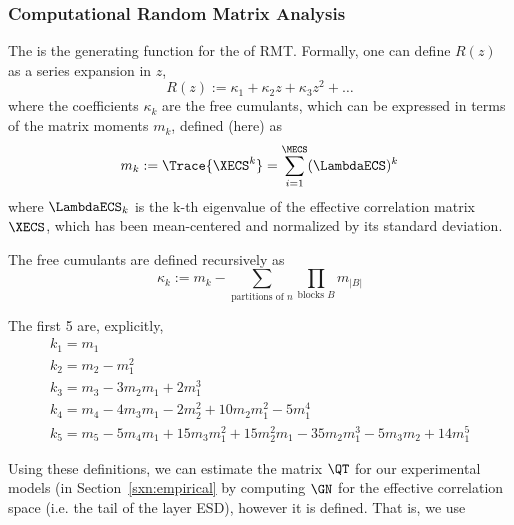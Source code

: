 \subsubsection{Computational Random Matrix Analysis}
\label{sxn:comp_rmt}
The \RTransform is the generating function for the \emph{\FreeCumulants} of RMT.  Formally, one can define $R(z)$ as a series expansion in $z$,
\begin{equation}
  \label{eqn:Rz_expansion}
  R(z) := \kappa_1 + \kappa_2 z + \kappa_3 z^2 + \ldots 
\end{equation}
where the coefficients $\kappa_{k}$ are the free cumulants, which can be expressed
in terms of the matrix moments $m_{k}$\cite{FreeCumulants}, defined (here) as
\begin{equation}
  \label{eqn:mk_defn}
  m_{k}:=\Trace{\XECS^{k}}=\sum_{i=1}^{\MECS}(\LambdaECS)^{k}
\end{equation}
where $\LambdaECS_{k}$ is the k-th eigenvalue of the effective correlation matrix $\mathbf\XECS$,
which  has been mean-centered and normalized by its standard deviation.

The free cumulants are defined recursively as
\begin{equation}
  \label{eqn:kappa_defn}
  \kappa_k := m_k - \sum_{\text{partitions of } n} \prod_{\text{blocks } B} m_{|B|} 
\end{equation}

The first 5 \emph{\Cumulants} are, explicitly,
\begin{align}
  \label{eqn:kappa_defn_2}
  k_1 = m_1 \\ \nonumber
  k_2 = m_2 - m_1^2 \\ \nonumber
  k_3 = m_3 - 3 m_2 m_1 + 2 m_1^3 \\ \nonumber
  k_4 = m_4 - 4 m_3 m_1 - 2 m_2^2 + 10 m_2 m_1^2 - 5 m_1^4 \\ \nonumber 
  k_5 = m_5 - 5 m_4 m_1 + 15 m_3 m_1^2 + 15 m_2^2 m_1 - 35 m_2 m_1^3 - 5 m_3 m_2 + 14 m_1^5
\end{align}

Using these definitions, we can estimate the \LayerQuality matrix $\QT$ for our experimental models
(in Section~\ref{sxn:empirical} by computing  $\GN$ for the effective correlation space
(i.e. the tail of the layer ESD), however it is defined.  That is, we use

